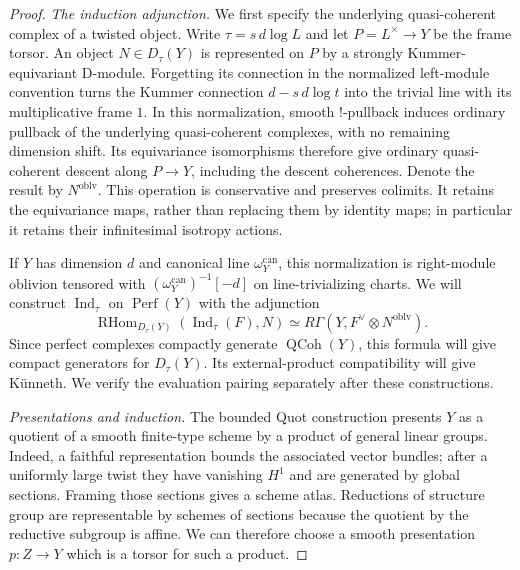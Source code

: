 \begin{proof}
\emph{The induction adjunction.}
We first specify the underlying quasi-coherent complex of a twisted
object.  Write $\tau=s\,d\log L$ and let $P=L^\times\to Y$ be the frame
torsor.  An object $N\in D_\tau(Y)$ is represented on $P$ by a strongly
Kummer-equivariant D-module.  Forgetting its connection in the normalized
left-module convention turns the Kummer connection
$d-s\,d\log t$ into the trivial line with its multiplicative frame $1$.
In this normalization, smooth $!$-pullback induces ordinary pullback of
the underlying quasi-coherent complexes, with no remaining dimension shift.
Its equivariance isomorphisms therefore give ordinary quasi-coherent
descent along $P\to Y$, including the descent coherences.  Denote the
result by $N^{\mathrm{oblv}}$.  This operation is conservative and
preserves colimits.  It retains the equivariance maps, rather than
replacing them by identity maps; in particular it retains their
infinitesimal isotropy actions.

If $Y$ has dimension $d$ and canonical line $\omega_Y^{\mathrm{can}}$,
this normalization is right-module oblivion tensored with
$(\omega_Y^{\mathrm{can}})^{-1}[-d]$ on line-trivializing charts.
We will construct $\operatorname{Ind}_\tau$ on $\operatorname{Perf}(Y)$
with the adjunction
\begin{equation}\label{foundations:induction-adjunction}
 \operatorname{RHom}_{D_\tau(Y)}
       (\operatorname{Ind}_\tau(F),N)
 \simeq R\Gamma(Y,F^\vee\otimes N^{\mathrm{oblv}}).
\end{equation}
Since perfect complexes compactly generate $\operatorname{QCoh}(Y)$,
this formula will give compact generators for $D_\tau(Y)$.  Its
external-product compatibility will give K\"unneth.  We verify the
evaluation pairing separately after these constructions.

\emph{Presentations and induction.}
The bounded Quot construction presents $Y$ as a quotient of a smooth
finite-type scheme by a product of general linear groups.  Indeed, a
faithful representation bounds the associated vector bundles; after a
uniformly large twist they have vanishing $H^1$ and are generated by
global sections.  Framing those sections gives a scheme atlas.  Reductions
of structure group are representable by schemes of sections because the
quotient by the reductive subgroup is affine.  We can therefore choose
a smooth presentation $p:Z\to Y$ which is a torsor for such a product.


\end{proof}

